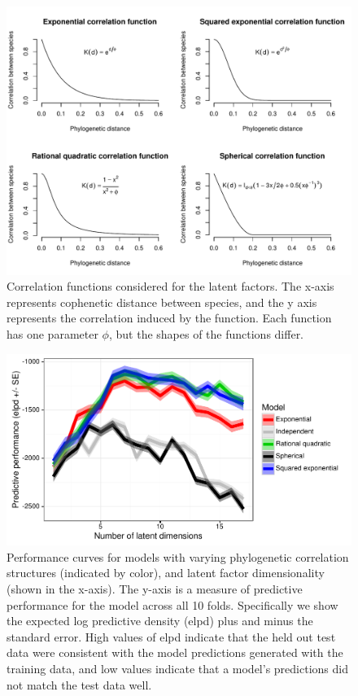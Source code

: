 \begin{figure}[ht]\centering
\includegraphics[width=\linewidth]{figs/ch5/cor_functions.pdf}
\caption[Correlation functions considered for the latent factors]{Correlation functions considered for the latent factors. The x-axis represents cophenetic distance between species, and the y axis represents the correlation induced by the function. Each function has one parameter $\phi$, but the shapes of the functions differ.}
\label{fig:cor_functions}
\end{figure}

\begin{figure}[ht]\centering
\includegraphics[width=\linewidth]{figs/ch5/model_comparisons.pdf}
\caption[Performance curves for models with varying phylogenetic correlation structures]{Performance curves for models with varying phylogenetic correlation structures (indicated by color), and latent factor dimensionality (shown in the x-axis). The y-axis is a measure of predictive performance for the model across all 10 folds. Specifically we show the expected log predictive density (elpd) plus and minus the standard error. High values of elpd indicate that the held out test data were consistent with the model predictions generated with the training data, and low values indicate that a model's predictions did not match the test data well.}
\label{fig:model_comparisons}
\end{figure}

